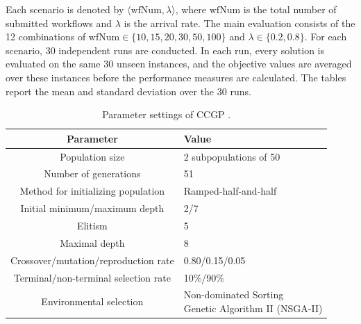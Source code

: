 \documentclass[10pt,journal]{IEEEtran}
\begin{document}
Each scenario is denoted by $\langle\mathrm{wfNum},\lambda\rangle$, where $\mathrm{wfNum}$ is the total number of submitted workflows and $\lambda$ is the arrival rate. The main evaluation consists of the 12 combinations of $\mathrm{wfNum}\in\{10,15,20,30,50,100\}$ and $\lambda\in\{0.2,0.8\}$. For each scenario, 30 independent runs are conducted. In each run, every solution is evaluated on the same 30 unseen instances, and the objective values are averaged over these instances before the performance measures are calculated. The tables report the mean and standard deviation over the 30 runs.

\begin{table}[!t]
\caption{Parameter settings of CCGP \cite{ccgp}.}
\label{Table: CCGP parameters}
\centering
\begin{tabular}{cl}
\toprule
\textbf{Parameter} & \textbf{Value} \\
\midrule
Population size & 2 subpopulations of 50 \\
Number of generations & 51 \\
Method for initializing population & Ramped-half-and-half \\
Initial minimum/maximum depth & 2/7 \\
Elitism & 5 \\
Maximal depth & 8 \\
Crossover/mutation/reproduction rate & 0.80/0.15/0.05 \\
Terminal/non-terminal selection rate & 10\%/90\% \\
Environmental selection & \makecell[l]{Non-dominated Sorting\\Genetic Algorithm II (NSGA-II)} \\
\bottomrule
\end{tabular}
\end{table}
\end{document}
